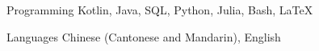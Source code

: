 

\begin{cvskills}

  \cvskill
    {Programming} %
    {Kotlin, Java, SQL, Python, Julia, Bash, LaTeX} %

  \cvskill
    {Languages} %
    {Chinese (Cantonese and Mandarin), English} %

\end{cvskills}
